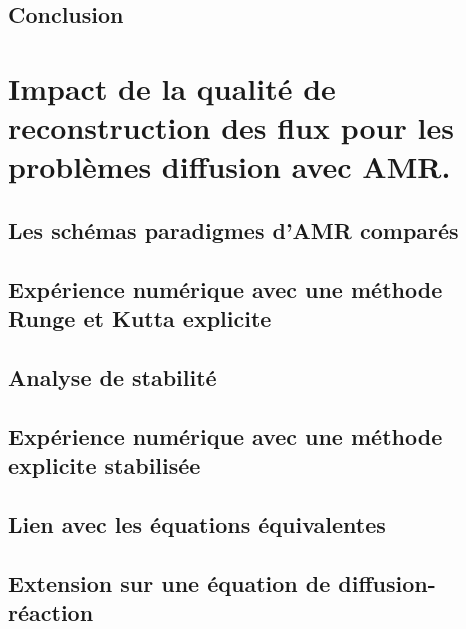 \documentclass[11pt]{report}
\theoremstyle{definition}
\theoremstyle{remark}
\begin{document}
        \subsection{Conclusion}
            
    
    \newpage
    \section{Impact de la qualité de reconstruction des flux pour les problèmes diffusion avec AMR.}
        \label{par:contrib_3}
        
        \subsection{Les schémas paradigmes d'AMR comparés}
            \label{par:contrib_3:pres_algos}
            
        \subsection{Expérience numérique avec une méthode Runge et Kutta explicite}
            \label{par:contrib_3:etude_ERK2}
            
        \newpage
        \subsection{Analyse de stabilité}
            \label{par:contrib_3:stab_MRA}
            
        \newpage
        \subsection{Expérience numérique avec une méthode explicite stabilisée}
            \label{par:contrib_3:ROCK2}
             
        \newpage
        \subsection{Lien avec les équations équivalentes}
            \label{par:contrib_3:eq_equiv}
             
        \newpage
        \subsection{Extension sur une équation de diffusion-réaction}      
        \newpage
\end{document}
